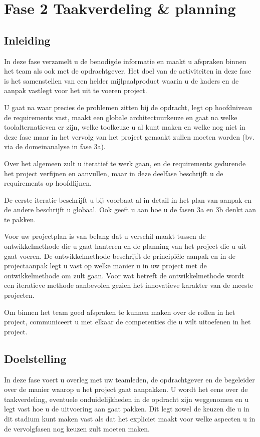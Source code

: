 \section{Fase 2 Taakverdeling \& planning}
\subsection{Inleiding}
In deze fase verzamelt u de benodigde informatie en maakt u afspraken
binnen het team als ook met de opdrachtgever. Het doel van de activiteiten
in deze fase  is het samenstellen van een helder mijlpaalproduct waarin u
de kaders en de aanpak vastlegt voor het uit te voeren project.

U gaat na waar precies de problemen zitten bij de opdracht, legt op
hoofdniveau de requirements vast, maakt een globale architectuurkeuze
en gaat na welke toolalternatieven er zijn, welke toolkeuze u al kunt
maken en welke nog niet in deze fase maar in het vervolg van het project
gemaakt zullen moeten worden (bv. via de domeinanalyse in fase 3a).

Over het algemeen zult u iteratief te werk gaan, en de requirements
gedurende het project verfijnen en aanvullen, maar in deze deelfase
beschrijft u de requirements op hoofdlijnen.

De eerste iteratie beschrijft u bij voorbaat al in detail in het
plan van aanpak en de andere beschrijft u globaal. Ook
geeft u aan hoe u de fasen 3a en 3b denkt aan te pakken.

Voor uw projectplan is van belang dat u verschil maakt tussen de
ontwikkelmethode die u gaat hanteren en de planning van het project
die u uit gaat voeren. De ontwikkelmethode beschrijft de principi\"ele
aanpak en in de projectaanpak legt u vast op welke manier u in uw
project met de ontwikkelmethode om  zult gaan. Voor wat betreft
de ontwikkelmethode wordt een iteratieve methode aanbevolen gezien
het innovatieve karakter van de meeste projecten.

Om binnen het team goed afspraken te kunnen maken over de rollen
in het project, communiceert u met elkaar de competenties die u
wilt uitoefenen in het project.

\subsection{Doelstelling}
    In deze fase voert u overleg met uw teamleden, de opdrachtgever en de
begeleider over de manier waarop u het project gaat aanpakken. U wordt het eens
over de taakverdeling, eventuele onduidelijkheden in de opdracht zijn weggenomen
en u legt vast hoe u de uitvoering aan gaat pakken. Dit legt zowel de keuzen
die u in dit stadium kunt maken vast als dat het expliciet maakt voor welke
aspecten u in de vervolgfasen nog keuzen zult moeten maken.

